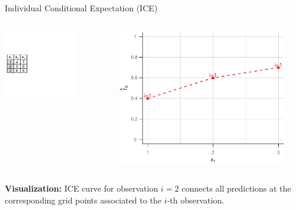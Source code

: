 \documentclass[aspectratio=169]{../latex_main/tntbeamer}  %
\begin{document}
\begin{frame}{Individual Conditional Expectation (ICE)}


\begin{columns}[T]
\begin{column}{0.55\textwidth}
\vspace*{-\topsep}
\vspace*{0.5\lineskip}
\includegraphics[page=6, trim=-3.69cm 0cm 3.69cm 0cm, width=0.7\textwidth]{figure/ice_pd_plot_demo}
\end{column}
\begin{column}{0.45\textwidth}

\begin{center}
\includegraphics[page=2, width=0.9\textwidth]{figure/ICE}
\end{center}

\end{column}
\end{columns}
\vspace*{\topsep}

\textbf{Visualization:} ICE curve for observation $i=2$ connects all predictions at the corresponding grid points associated to the $i$-th observation.

\end{frame}
\end{document}
